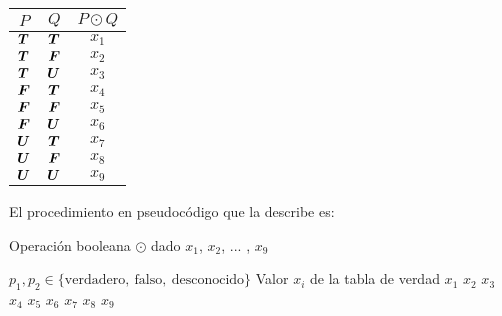 \begin{center}
  \begin{tabular}{|c|c||c|}
    \hline
    \( P \) & \( Q \) & \( P \odot Q \) \\ [0.5ex] \hline\hline
    \( \boldsymbol{T} \) & \( \boldsymbol{T} \) & \( x_{1} \) \\ \hline
    \( \boldsymbol{T} \) & \( \boldsymbol{F} \) & \( x_{2} \) \\ \hline
    \( \boldsymbol{T} \) & \( \boldsymbol{U} \) & \( x_{3} \) \\ \hline
    \( \boldsymbol{F} \) & \( \boldsymbol{T} \) & \( x_{4} \) \\ \hline
    \( \boldsymbol{F} \) & \( \boldsymbol{F} \) & \( x_{5} \) \\ \hline
    \( \boldsymbol{F} \) & \( \boldsymbol{U} \) & \( x_{6} \) \\ \hline
    \( \boldsymbol{U} \) & \( \boldsymbol{T} \) & \( x_{7} \) \\ \hline
    \( \boldsymbol{U} \) & \( \boldsymbol{F} \) & \( x_{8} \) \\ \hline
    \( \boldsymbol{U} \) & \( \boldsymbol{U} \) & \( x_{9} \) \\ \hline
  \end{tabular}
\end{center}

El procedimiento en pseudocódigo que la describe es:

\begin{algorithm}
  \caption{Operación booleana \( \odot \) dado \( x_{1} \), \( x_{2} \), ... , \( x_{9} \)}
  \label{alg:op-bin-gen-2}
  \begin{algorithmic}
    \REQUIRE \( p_{1}, p_{2} \in \{ \mathrm{verdadero},\ \mathrm{falso},\ \mathrm{desconocido} \} \)
    \ENSURE Valor \( x_{i} \) de la tabla de verdad
    \RETURN \( x_{1} \)
    \RETURN \( x_{2} \)
    \RETURN \( x_{3} \)
    \ENDIF
    \RETURN \( x_{4} \)
    \RETURN \( x_{5} \)
    \RETURN \( x_{6} \)
    \ENDIF
    \RETURN \( x_{7} \)
    \RETURN \( x_{8} \)
    \RETURN \( x_{9} \)
    \ENDIF
    \ENDIF
  \end{algorithmic}
\end{algorithm}

